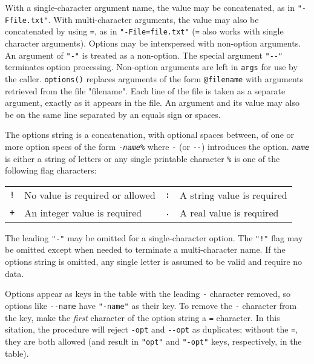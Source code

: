\noindent With a single-character argument name,
the value may be concatenated, as in
\texttt{"-Ffile.txt"}.
With multi-character arguments, the value may also be concatenated by using
\texttt{=}, as in \texttt{"-File=file.txt"} (\texttt{=} also works with single
character arguments).
Options may be interspersed with non-option
arguments. An argument of \texttt{"-"} is
treated as a non-option. The special argument
\texttt{"-{}-"} terminates option
processing. Non-option arguments are left in \texttt{args}
for use by the caller. \texttt{options()} replaces arguments of the form
\texttt{@filename} with arguments retrieved from the file
"filename". Each line of the file is taken
as a separate argument, exactly as it appears in the file.
An argument and its value may also be on the same line separated by an
equals sign or spaces.

The options string is a concatenation, with optional spaces between, of
one or more option specs of the form
\texttt{{}-}\texttt{\textit{name}}\texttt{\%} where \texttt{{}-}
(or \texttt{-{}-})
introduces the option.
\texttt{\textit{name}} is either a string of letters or any single
printable character
\texttt{\%} is one of the following flag characters:

\begin{tabular}{m{0.15in}m{2.85in}m{0.15in}m{2.85in}}
\texttt{!} & No value is required or allowed &
\texttt{:} & A string value is required\\
\texttt{+} & An integer value is required &
\texttt{.} & A real value is required
\end{tabular}

The leading \texttt{"-"} may be omitted for
a single-character option. The \texttt{"!"}
flag may be omitted except when needed to terminate a multi-character
name. %
If the options string is omitted, any single letter is assumed to be valid and
require no data.

Options appear as keys in the table with the leading \texttt{-} character
removed, so options like \texttt{-{}-name} have \texttt{"-name"} as their
key. To remove the \texttt{-} character from the key, make the {\em first}
character of the option string a \texttt{=} character. In this sitation, the
procedure will reject \texttt{-opt} and \texttt{-{}-opt} as duplicates;
without the \texttt{=}, they are both allowed (and result in \texttt{"opt"}
and \texttt{"-opt"} keys, respectively, in the table).

